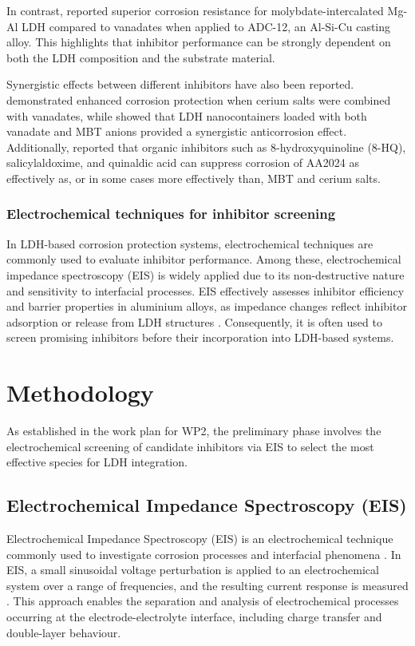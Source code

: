 \documentclass[11pt,twoside,a4paper]{report}
\begin{document}
In contrast, \citet{Matsui2025} reported superior corrosion resistance for molybdate-intercalated Mg-Al LDH compared to vanadates when applied to ADC-12, an Al-Si-Cu casting alloy. This highlights that inhibitor performance can be strongly dependent on both the LDH composition and the substrate material.

Synergistic effects between different inhibitors have also been reported. \citet{Zhang2015} demonstrated enhanced corrosion protection when cerium salts were combined with vanadates, while \citet{Tedim2010} showed that LDH nanocontainers loaded with both vanadate and MBT anions provided a synergistic anticorrosion effect. Additionally, \citet{Lamaka2007} reported that organic inhibitors such as 8-hydroxyquinoline (8-HQ), salicylaldoxime, and quinaldic acid can suppress corrosion of AA2024 as effectively as, or in some cases more effectively than, MBT and cerium salts.

\subsection{Electrochemical techniques for inhibitor screening}
In LDH-based corrosion protection systems, electrochemical techniques are commonly used to evaluate inhibitor performance. Among these, electrochemical impedance spectroscopy (EIS) is widely applied due to its non-destructive nature and sensitivity to interfacial processes. EIS effectively assesses inhibitor efficiency and barrier properties in aluminium alloys, as impedance changes reflect inhibitor adsorption or release from LDH structures \cite{Alvarez2010,Zheludkevich2010,Zhou2017,Zhang2017,He2020,Lamaka2007,Tedim2011,Yasakau2014}. Consequently, it is often used to screen promising inhibitors before their incorporation into LDH-based systems.


\chapter{Methodology}
As established in the work plan for WP2, the preliminary phase involves the electrochemical screening of candidate inhibitors via EIS to select the most effective species for LDH integration.

\section{Electrochemical Impedance Spectroscopy (EIS)}

Electrochemical Impedance Spectroscopy (EIS) is an electrochemical technique commonly used to investigate corrosion processes and interfacial phenomena \cite{Joshua2025}. In EIS, a small sinusoidal voltage perturbation is applied to an electrochemical system over a range of frequencies, and the resulting current response is measured \cite{Joshua2025,Lazanas2023}. This approach enables the separation and analysis of electrochemical processes occurring at the electrode-electrolyte interface, including charge transfer and double-layer behaviour.
\end{document}
